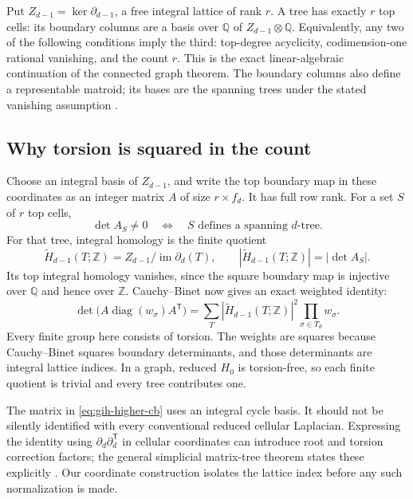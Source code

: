 \documentclass[11pt]{article}
\theoremstyle{definition}
\theoremstyle{remark}
\newcommand{\Q}{\mathbb Q}
\newcommand{\Z}{\mathbb Z}
\begin{document}
Put \(Z_{d-1}=\ker\partial_{d-1}\), a free integral lattice of rank
\(r\).  A tree has exactly \(r\) top cells: its boundary columns are a
basis over \(\Q\) of \(Z_{d-1}\otimes\Q\).  Equivalently, any two of
the following conditions imply the third: top-degree acyclicity,
codimension-one rational vanishing, and the count \(r\).  This is the
exact linear-algebraic continuation of the connected graph theorem.
The boundary columns also define a representable matroid; its bases are
the spanning trees under the stated vanishing assumption
\cite{gih-dkm-trees}.

\subsection{Why torsion is squared in the count}

Choose an integral basis of \(Z_{d-1}\), and write the top boundary map
in these coordinates as an integer matrix \(A\) of size \(r\times f_d\).
It has full row rank.  For a set \(S\) of \(r\) top cells,
\[
 \det A_S\ne0
 \quad\Longleftrightarrow\quad S\text{ defines a spanning }d\text{-tree}.
\]
For that tree, integral homology is the finite quotient
\[
 \widetilde H_{d-1}(T;\Z)=Z_{d-1}/\operatorname{im}\partial_d(T),
 \qquad |\widetilde H_{d-1}(T;\Z)|=|\det A_S|.
\]
Its top integral homology vanishes, since the square boundary map is
injective over \(\Q\) and hence over \(\Z\).  Cauchy--Binet now gives
an exact weighted identity:
\begin{equation}
 \det\bigl(A\operatorname{diag}(w_\sigma)A^{\mathsf T}\bigr)
 =\sum_T |\widetilde H_{d-1}(T;\Z)|^2
                  \prod_{\sigma\in T_d}w_\sigma.
 \label{eq:gih-higher-cb}
\end{equation}
Every finite group here consists of torsion.  The weights are squares
because Cauchy--Binet squares boundary determinants, and those
determinants are integral lattice indices.  In a graph, reduced
\(H_0\) is torsion-free, so each finite quotient is trivial and every
tree contributes one.

The matrix in \eqref{eq:gih-higher-cb} uses an integral cycle basis.
It should not be silently identified with every conventional reduced
cellular Laplacian.  Expressing the identity using
\(\partial_d\partial_d^{\mathsf T}\) in cellular coordinates can
introduce root and torsion correction factors; the general simplicial
matrix-tree theorem states these explicitly \cite{gih-dkm-matrix}.
Our coordinate construction isolates the lattice index before any such
normalization is made.
\end{document}
